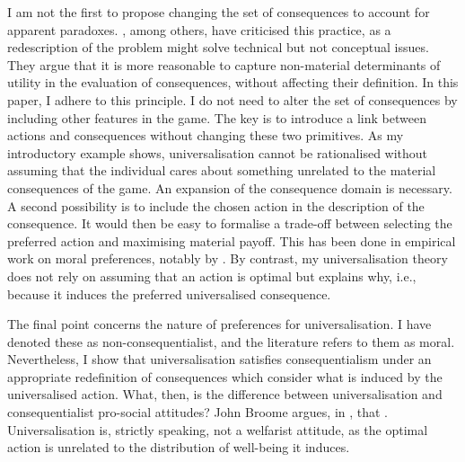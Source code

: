 I am not the first to propose changing the set of consequences to account for apparent paradoxes. \cite{baccelliCanRedescriptionsOutcomes2021}, among others, have criticised this practice, as a redescription of the problem might solve technical but not conceptual issues. They argue that it is more reasonable to capture non-material determinants of utility in the evaluation of consequences, without affecting their definition. In this paper, I adhere to this principle. I do not need to alter the set of consequences by including other features in the game. The key is to introduce a link between actions and consequences without changing these two primitives. As my introductory example shows, universalisation cannot be rationalised without assuming that the individual cares about something unrelated to the material consequences of the game. An expansion of the consequence domain is necessary. A second possibility is to include the chosen action in the description of the consequence. It would then be easy to formalise a trade-off between selecting the preferred action and maximising material payoff. This has been done in empirical work on moral preferences, notably by \cite{cappelenPluralismFairnessIdeals2007}. By contrast, my universalisation theory does not rely on assuming that an action is optimal but explains why, i.e., because it induces the preferred universalised consequence.

The final point concerns the nature of preferences for universalisation. I have denoted these as non-consequentialist, and the literature refers to them as moral. Nevertheless, I show that universalisation satisfies consequentialism under an appropriate redefinition of consequences which consider what is induced by the universalised action. What, then, is the difference between universalisation and consequentialist pro-social attitudes? John Broome argues, in \citet[p. 120]{bradleyJohnBroome2021}, that . Universalisation is, strictly speaking, not a welfarist attitude, as the optimal action is unrelated to the distribution of well-being it induces.

